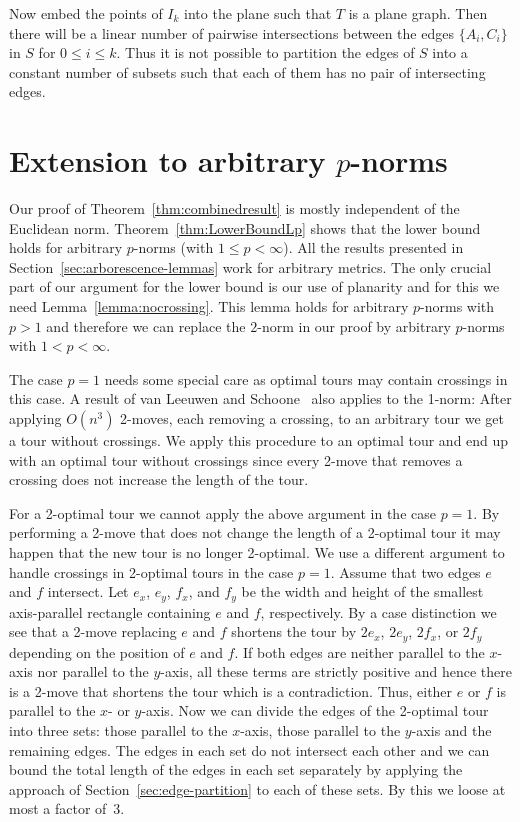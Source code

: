 \documentclass[a4paper, 11pt]{article}
\def\blue#1{#1}
\begin{document}
Now embed the points of $I_k$ into the plane such that $T$ is a plane graph. 
Then there will be a linear number of pairwise intersections between the edges $\{A_i, C_i\}$ in $S$ for $0\le i\le k$. 
Thus it is not possible to partition the edges of $S$
into a constant number of subsets such that each of them has no pair of intersecting edges.


\section{Extension to arbitrary \texorpdfstring{$p$}{p}-norms}
\label{sec:LpNorms}

Our proof of \blue{Theorem~\ref{thm:combinedresult}} is mostly independent of the Euclidean norm. 
\blue{Theorem~\ref{thm:LowerBoundLp} shows that the lower bound holds for arbitrary $p$-norms (with $1\le p < \infty$). 
All} the results
presented in Section~\ref{sec:arborescence-lemmas} work for arbitrary metrics. The only crucial part of
our argument \blue{for the lower bound} is our use of planarity and for this we need Lemma~\ref{lemma:nocrossing}. This lemma holds for arbitrary $p$-norms
\blue{with $p > 1$} and therefore we can replace the $2$-norm in our proof by arbitrary $p$-norms \blue{with $1 < p < \infty$}. 

\blue{The case $p=1$ needs some special care as optimal tours may contain crossings in this case. 
A result of van Leeuwen and Schoone~\cite{LS1982} also applies to the 1-norm: After applying $O(n^3)$ 2-moves,
each removing a crossing, to an arbitrary tour we get a tour without crossings. We apply this procedure to an optimal tour and end up with an optimal tour without crossings since every 2-move that removes a crossing does not increase the length of the tour.}

 \blue{For a 2-optimal tour we cannot apply the above argument in the case $p=1$. 
By performing a 2-move that does not change the length of a 2-optimal tour it may happen that the new tour is no longer 2-optimal. 
We use a different argument to handle crossings in 2-optimal tours in the case $p=1$.
Assume that two edges $e$ and $f$ intersect. Let $e_x$, $e_y$, $f_x$, and $f_y$ be the width and height of the smallest axis-parallel rectangle
containing $e$ and $f$, respectively. 
By a case distinction we see that a 2-move replacing $e$ and $f$ shortens the tour by $2 e_x$, $2 e_y$, $2 f_x$, or $2 f_y$ 
depending on the position of $e$ and $f$. If both edges are neither parallel to the $x$-axis nor parallel to the $y$-axis, all these terms 
are strictly positive and hence there is a 2-move that shortens the tour which is a contradiction. 
Thus, either $e$ or $f$ is parallel to the $x$- or $y$-axis. Now we can divide the edges of
the 2-optimal tour into three sets: those parallel to the $x$-axis, those parallel to the $y$-axis and the remaining edges. 
The edges in each set do not intersect each other and we can bound the total length of the edges in each set separately 
by applying the approach of Section~\ref{sec:edge-partition} to each of these sets. By this we loose at most a factor of~3. }
\end{document}
